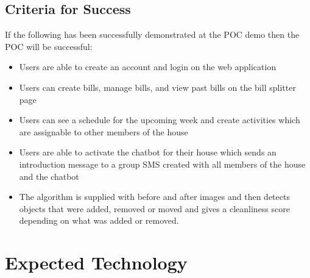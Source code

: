 \documentclass{article}
\begin{document}
\subsection{Criteria for Success}
If the following has been successfully demonstrated at the POC demo then the POC will be successful:
\begin{itemize}
\item Users are able to create an account and login on the web application
\item Users can create bills, manage bills, and view past bills on the bill splitter page
\item Users can see a schedule for the upcoming week and create activities which are assignable to other members of the house
\item Users are able to activate the chatbot for their house which sends an introduction message to a group SMS created with all members of the house and the chatbot
\item The algorithm is supplied with before and after images and then detects objects that were added, removed or moved and gives a cleanliness score depending on what was added or removed.
\end{itemize}
\section{Expected Technology}
\end{document}
